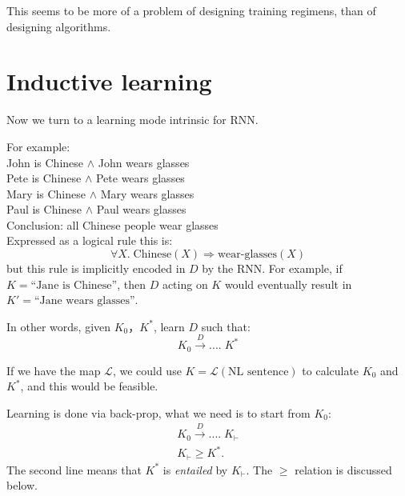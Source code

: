 \documentclass[12pt]{article}
\newcommand{\tab}{\hspace*{1cm}}
\begin{document}
This seems to be more of a problem of designing training regimens, than of designing algorithms.

\section{Inductive learning}

Now we turn to a learning mode intrinsic for RNN.

For example:\\
\tab John is Chinese $\wedge$ John wears glasses \\
\tab Pete is Chinese $\wedge$ Pete wears glasses \\
\tab Mary is Chinese $\wedge$ Mary wears glasses \\
\tab Paul is Chinese $\wedge$ Paul wears glasses \\
\tab Conclusion: all Chinese people wear glasses \\
Expressed as a logical rule this is:
\begin{equation}
\forall X. \; \mbox{Chinese}(X) \Rightarrow \mbox{wear-glasses}(X)
\end{equation}
but this rule is implicitly encoded in $D$ by the RNN.  For example, if $K = \mbox{``Jane is Chinese''}$, then $D$ acting on $K$ would eventually result in $K' = \mbox{``Jane wears glasses''}$.

In other words, given $K_0$，$K^*$, learn $D$ such that:
\begin{equation}
K_0 \stackrel{D}{\longrightarrow} .... \; K^*
\end{equation}

If we have the map $\mathcal{L}$, we could use $K = \mathcal{L}(\mbox{NL sentence})$ to calculate $K_0$ and $K^*$, and this would be feasible.

Learning is done via back-prop, what we need is to start from $K_0$:
\begin{eqnarray}
K_0 \stackrel{D}{\longrightarrow} .... \; K_\vdash \nonumber \\
K_\vdash \ge K^* .
\end{eqnarray}
The second line means that $K^*$ is \textit{entailed} by $K_\vdash$.  The $\ge$ relation is discussed below.
\end{document}
